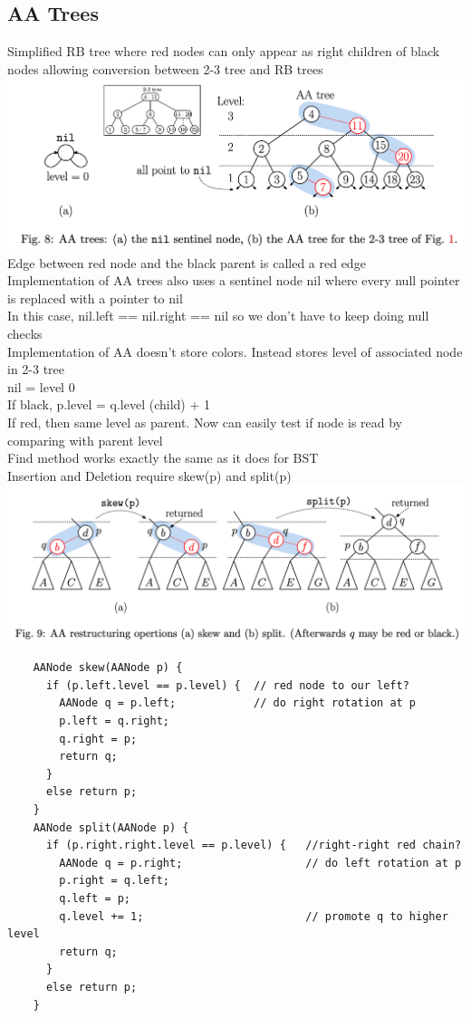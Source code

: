 \documentclass{article}
\begin{document}
  \subsection{AA Trees}
  Simplified RB tree where red nodes can only appear as right children of black nodes allowing conversion between 2-3 tree and RB trees \\
  \includegraphics[width=\textwidth]{AATree}
  \indent Edge between red node and the black parent is called a red edge \\
  \indent Implementation of AA trees also uses a sentinel node nil where every null pointer is replaced with a pointer to nil\\
  \indent \indent In this case, nil.left == nil.right == nil so we don't have to keep doing null checks \\
  \indent Implementation of AA doesn't store colors. Instead stores level of associated node in 2-3 tree \\
  \indent \indent nil = level 0\\
  \indent \indent If black, p.level = q.level (child) + 1\\
  \indent \indent If red, then same level as parent. Now can easily test if node is read by comparing with parent level \\
  Find method works exactly the same as it does for BST \\
  Insertion and Deletion require skew(p) and split(p)\\
  \includegraphics[width=\textwidth]{AASkewSplit}
  \begin{lstlisting}
    AANode skew(AANode p) {   
      if (p.left.level == p.level) {  // red node to our left?
        AANode q = p.left;            // do right rotation at p
        p.left = q.right;
        q.right = p;
        return q;
      }
      else return p;
    }
    AANode split(AANode p) {
      if (p.right.right.level == p.level) {   //right-right red chain?
        AANode q = p.right;                   // do left rotation at p
        p.right = q.left;
        q.left = p;
        q.level += 1;                         // promote q to higher level
        return q;
      }
      else return p;
    }
  \end{lstlisting}
\end{document}
